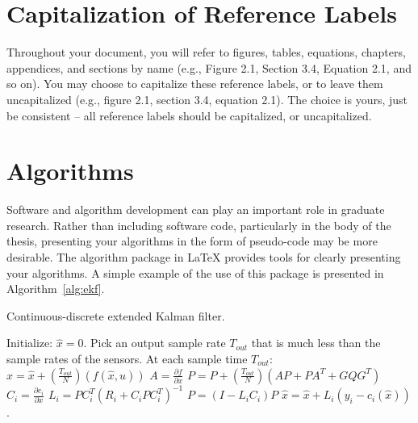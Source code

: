 \section{Capitalization of Reference Labels}
Throughout your document, you will refer to figures, tables, equations, chapters, appendices, and sections by name (e.g., Figure 2.1, Section 3.4, Equation 2.1, and so on). You may choose to capitalize these reference labels, or to leave them uncapitalized (e.g., figure 2.1, section 3.4, equation 2.1). The choice is yours, just be consistent -- all reference labels should be capitalized, or uncapitalized.

\section{Algorithms}
Software and algorithm development can play an important role in graduate research. Rather than including software code, particularly in the body of the thesis, presenting your algorithms in the form of pseudo-code may be more desirable. The {\ttfamily algorithm} package in \LaTeX{} provides tools for clearly presenting your algorithms. A simple example of the use of this package is presented in Algorithm~\ref{alg:ekf}.

\begin{algorithm}
	\caption{{\color{black} Continuous-discrete extended Kalman filter.}} \label{alg:ekf}
	\begin{algorithmic}[1]
	    \State Initialize:  $\hat{x} = 0$.
	    \State Pick an output sample rate $T_{\textit{out}}$ that is much less than
	    the sample rates of the sensors.
	    \State At each sample time $T_{\textit{out}}$:
	        \State $\hat{x} = \hat{x} + \left(\frac{T_{\textit{out}}}{N}\right) \left( f(\hat{x}, u)\right)$
	        \State $A = \frac{\partial{f}}{\partial{x}}$
	        \State $P = P + \left(\frac{T_{\textit{out}}}{N}\right)
	        \left(AP+PA^T + GQG^T\right)$
	    \EndFor
	        \State $C_i = \frac{\partial{c_i}}{\partial{x}}$
	        \State $L_i = PC_i^T(R_i+C_iPC_i^T)^{-1}$
	        \State $P = (I-L_iC_i)P$
	        \State $\hat{x} = \hat{x} +  L_i\left( y_i - c_i( \hat{x})
	        \right)$.
	    \EndIf
	\end{algorithmic}
\end{algorithm}

